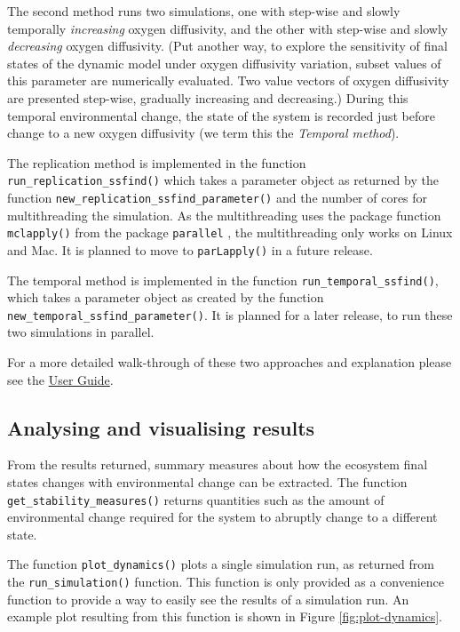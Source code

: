 \documentclass[]{elsarticle} %
\begin{document}
The second method runs two simulations, one with step-wise and slowly temporally \emph{increasing} oxygen diffusivity, and the other with step-wise and slowly \emph{decreasing} oxygen diffusivity. (Put another way, to explore the sensitivity of final states of the dynamic model under oxygen diffusivity variation, subset values of this parameter are numerically evaluated. Two value vectors of oxygen diffusivity are presented step-wise, gradually increasing and decreasing.) During this temporal environmental change, the state of the system is recorded just before change to a new oxygen diffusivity (we term this the \emph{Temporal method}).

The replication method is implemented in the function \texttt{run\_replication\_ssfind()} which takes a parameter object as returned by the function \texttt{new\_replication\_ssfind\_parameter()} and the number of cores for multithreading the simulation. As the multithreading uses the package function \texttt{mclapply()} from the package \texttt{parallel} \citep{RCoreTeam2022}, the multithreading only works on Linux and Mac. It is planned to move to \texttt{parLapply()} \citep{RCoreTeam2022} in a future release.

The temporal method is implemented in the function \texttt{run\_temporal\_ssfind()}, which takes a parameter object as created by the function \texttt{new\_temporal\_ssfind\_parameter()}. It is planned for a later release, to run these two simulations in parallel.

For a more detailed walk-through of these two approaches and explanation please see the \href{https://uzh-peg.r-universe.dev/articles/microxanox/User-guide.html}{User Guide}.

\hypertarget{analysing-and-visualising-results}{%
\subsection{Analysing and visualising results}\label{analysing-and-visualising-results}}

From the results returned, summary measures about how the ecosystem final states changes with environmental change can be extracted. The function \texttt{get\_stability\_measures()} returns quantities such as the amount of environmental change required for the system to abruptly change to a different state.

The function \texttt{plot\_dynamics()} plots a single simulation run, as returned from the \texttt{run\_simulation()} function. This function is only provided as a convenience function to provide a way to easily see the results of a simulation run. An example plot resulting from this function is shown in Figure \ref{fig:plot-dynamics}.
\end{document}

